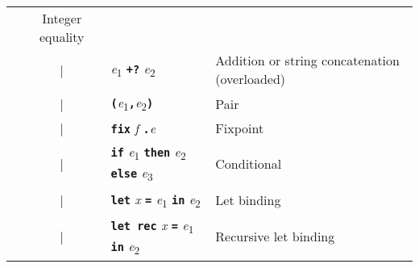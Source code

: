 \documentclass{article}
\newcommand{\kw}[1]{\textbf{\texttt{#1}}}
\newcommand{\metavar}[1]{\textit{#1}}
\begin{document}
\begin{tabular}{rcll}
                    & Integer equality \\
            & |  & \metavar{e}\textsubscript{1} \kw{+?} \metavar{e}\textsubscript{2}
                    & Addition or string concatenation (overloaded) \\
            & |  & \kw{(}\metavar{e}\textsubscript{1}\kw{,}\metavar{e}\textsubscript{2}\kw{)}
                    & Pair \\
            & |  & \kw{fix} \metavar{f} \kw{.}\metavar{e}
                    & Fixpoint \\
            & |  & \kw{if} \metavar{e}\textsubscript{1} \kw{then} \metavar{e}\textsubscript{2} \kw{else} \metavar{e}\textsubscript{3}
                    & Conditional \\
            & |  & \kw{let} \metavar{x} \kw{=} \metavar{e}\textsubscript{1} \kw{in} \metavar{e}\textsubscript{2}
                    & Let binding \\
            & |  & \kw{let rec} \metavar{x} \kw{=} \metavar{e}\textsubscript{1} \kw{in} \metavar{e}\textsubscript{2}
                    & Recursive let binding \\

\end{tabular}
\end{document}
